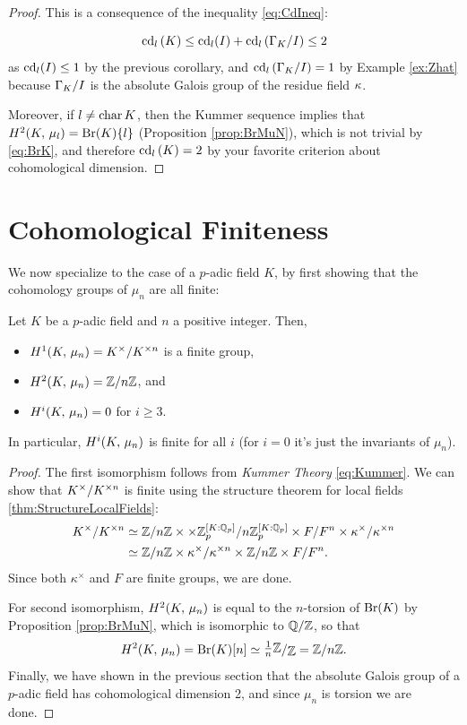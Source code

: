 \documentclass[a4paper, oneside]{memoir}
\begin{document}
\begin{proof}
    This is a consequence of the inequality \ref{eq:CdIneq}:

    \[
        \operatorname{cd}_l{(K)}\leq \operatorname{cd}_l(I)+\operatorname{cd}_l{(\Gamma_K / I)} \leq 2
    \]
    as $\operatorname{cd}_l(I)\leq 1$ by the previous corollary, and $\operatorname{cd}_l{(\Gamma_K / I)} = 1$ by Example \ref{ex:Zhat} because $\Gamma_K / I$ is the absolute Galois group of the residue
    field $\kappa$.

    Moreover, if $l\neq \operatorname{char}{K}$, then the Kummer sequence implies that $H^{2}( K, \, \mu_l )=\mathrm{Br}(K)\{l\}$ (Proposition \ref{prop:BrMuN}), which is not trivial by \eqref{eq:BrK}, and
    therefore $\operatorname{cd}_l{(K)}=2$ by your favorite criterion about cohomological dimension.
\end{proof}

\section{Cohomological Finiteness}

We now specialize to the case of a $p$-adic field $K$, by first showing that the cohomology groups of $\mu_n$ are all finite:

\begin{theorem}\label{thm:CohomMuN}
    Let $K$ be a $p$-adic field and $n$ a positive integer.
    Then,
    \begin{itemize}
        \item $H^{1}( K, \, \mu_n ) = K^\times/K^{\times n}$ is a finite group,
        \item $H^{2}( K, \, \mu_n ) = \mathbb{Z}/n\mathbb{Z}$, and
        \item $H^{i}( K, \, \mu_n ) = 0$ for $i\geq 3$.
    \end{itemize}
    In particular, $H^{i}( K, \, \mu_n )$ is finite for all $i$ (for $i=0$ it's just the invariants of $\mu_n$).
\end{theorem}
\begin{proof}
    The first isomorphism follows from \textit{Kummer Theory} \eqref{eq:Kummer}. We can show that $K^\times/K^{\times n}$ is finite using the structure theorem for local fields \ref{thm:StructureLocalFields}:
    \begin{align*}
        K^\times/K^{\times n} & \simeq \mathbb{Z}/n\mathbb{Z} \times  \times \mathbb{Z}_p^{[K:\mathbb{Q}_p]}/n \mathbb{Z}_p^{[K:\mathbb{Q}_p]} \times F/F^n \times  \kappa^\times/\kappa^{\times n} \\
                                & \simeq \mathbb{Z}/n\mathbb{Z} \times \kappa^\times/\kappa^{\times n} \times  \mathbb{Z}/n\mathbb{Z} \times F/F^n.
    \end{align*}
    Since both $\kappa^\times$ and $F$ are finite groups, we are done.

    For second isomorphism, $H^{2}( K, \, \mu_n )$ is equal to the $n$-torsion of $\mathrm{Br}(K)$ by Proposition \ref{prop:BrMuN}, which is isomorphic to $\mathbb{Q}/\mathbb{Z}$, so that
    \[
        \H{2}{\K}{\mu_n} = \Br{\K}[n] \simeq \ssfrac{\frac{1}{n}\Z}{\Z} = \Z/n\Z.
    \]
    Finally, we have shown in the previous section that the absolute Galois group of a $p$-adic field has cohomological dimension 2, and since $\mu_n$ is torsion we are done.
\end{proof}
\end{document}
